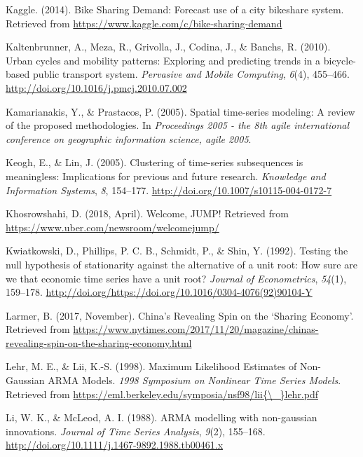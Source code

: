 \documentclass[12pt,oneside]{reedthesis}
\begin{document}
\hypertarget{ref-kaggle}{}
Kaggle. (2014). Bike Sharing Demand: Forecast use of a city bikeshare
system. Retrieved from
\url{https://www.kaggle.com/c/bike-sharing-demand}

\hypertarget{ref-kaltenbrunner2010}{}
Kaltenbrunner, A., Meza, R., Grivolla, J., Codina, J., \& Banchs, R.
(2010). Urban cycles and mobility patterns: Exploring and predicting
trends in a bicycle-based public transport system. \emph{Pervasive and
Mobile Computing}, \emph{6}(4), 455--466.
\url{http://doi.org/10.1016/j.pmcj.2010.07.002}

\hypertarget{ref-kamarianakis2005}{}
Kamarianakis, Y., \& Prastacos, P. (2005). Spatial time-series modeling:
A review of the proposed methodologies. In \emph{Proceedings 2005 - the
8th agile international conference on geographic information science,
agile 2005}.

\hypertarget{ref-keogh2005}{}
Keogh, E., \& Lin, J. (2005). Clustering of time-series subsequences is
meaningless: Implications for previous and future research.
\emph{Knowledge and Information Systems}, \emph{8}, 154--177.
\url{http://doi.org/10.1007/s10115-004-0172-7}

\hypertarget{ref-uber2018}{}
Khosrowshahi, D. (2018, April). Welcome, JUMP! Retrieved from
\url{https://www.uber.com/newsroom/welcomejump/}

\hypertarget{ref-kwiat1992}{}
Kwiatkowski, D., Phillips, P. C. B., Schmidt, P., \& Shin, Y. (1992).
Testing the null hypothesis of stationarity against the alternative of a
unit root: How sure are we that economic time series have a unit root?
\emph{Journal of Econometrics}, \emph{54}(1), 159--178.
\url{http://doi.org/https://doi.org/10.1016/0304-4076(92)90104-Y}

\hypertarget{ref-nytimes}{}
Larmer, B. (2017, November). China's Revealing Spin on the `Sharing
Economy'. Retrieved from
\url{https://www.nytimes.com/2017/11/20/magazine/chinas-revealing-spin-on-the-sharing-economy.html}

\hypertarget{ref-lehr1998}{}
Lehr, M. E., \& Lii, K.-S. (1998). Maximum Likelihood Estimates of
Non-Gaussian ARMA Models. \emph{1998 Symposium on Nonlinear Time Series
Models}. Retrieved from
\href{https://eml.berkeley.edu/symposia/nsf98/lii\%7B/_\%7Dlehr.pdf}{https://eml.berkeley.edu/symposia/nsf98/lii\{\textbackslash{}\_\}lehr.pdf}

\hypertarget{ref-li1988}{}
Li, W. K., \& McLeod, A. I. (1988). ARMA modelling with non-gaussian
innovations. \emph{Journal of Time Series Analysis}, \emph{9}(2),
155--168. \url{http://doi.org/10.1111/j.1467-9892.1988.tb00461.x}
\end{document}
